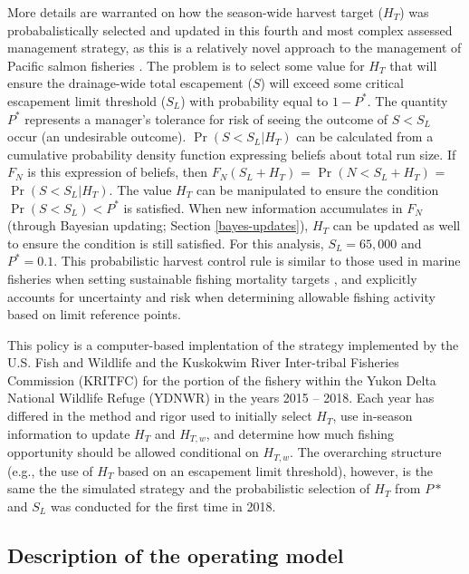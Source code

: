 \documentclass[12pt,]{book}
\theoremstyle{definition}
\theoremstyle{definition}
\theoremstyle{definition}
\theoremstyle{remark}
\begin{document}
More details are warranted on how the season-wide harvest target
(\(H_T\)) was probabalistically selected and updated in this fourth and
most complex assessed management strategy, as this is a relatively novel
approach to the management of Pacific salmon fisheries \citep[but see][
for another application using simulation
techniques]{catalano-jones-2014}. The problem is to select some value
for \(H_T\) that will ensure the drainage-wide total escapement (\(S\))
will exceed some critical escapement limit threshold (\(S_L\)) with
probability equal to \(1 - P^*\). The quantity \(P^*\) represents a
manager's tolerance for risk of seeing the outcome of \(S < S_L\) occur
(an undesirable outcome). \(\Pr(S<S_L|H_T)\) can be calculated from a
cumulative probability density function expressing beliefs about total
run size. If \(F_N\) is this expression of beliefs, then
\(F_N(S_L + H_T)\) = \(\Pr(N < S_L + H_T)\) = \(\Pr(S<S_L|H_T)\). The
value \(H_T\) can be manipulated to ensure the condition
\(\Pr(S<S_L) < P^*\) is satisfied. When new information accumulates in
\(F_N\) (through Bayesian updating; Section \ref{bayes-updates}),
\(H_T\) can be updated as well to ensure the condition is still
satisfied. For this analysis, \(S_L = 65,000\) \citep[the lower bound of
the current drainage-wide escapement goal for Chinook
salmon;][]{hamazaki-etal-2012} and \(P^* = 0.1\). This probabilistic
harvest control rule is similar to those used in marine fisheries when
setting sustainable fishing mortality targets
\citep{prager-etal-2003, shertzer-etal-2010}, and explicitly accounts
for uncertainty and risk when determining allowable fishing activity
based on limit reference points.

This policy is a computer-based implentation of the strategy implemented
by the U.S. Fish and Wildlife and the Kuskokwim River Inter-tribal
Fisheries Commission (KRITFC) for the portion of the fishery within the
Yukon Delta National Wildlife Refuge (YDNWR) in the years 2015 -- 2018.
Each year has differed in the method and rigor used to initially select
\(H_T\), use in-season information to update \(H_T\) and \(H_{T,w}\),
and determine how much fishing opportunity should be allowed conditional
on \(H_{T,w}\). The overarching structure (e.g., the use of \(H_T\)
based on an escapement limit threshold), however, is the same the the
simulated strategy and the probabilistic selection of \(H_T\) from
\(P*\) and \(S_L\) was conducted for the first time in 2018.

\subsection{Description of the operating model}\label{om}
\end{document}
